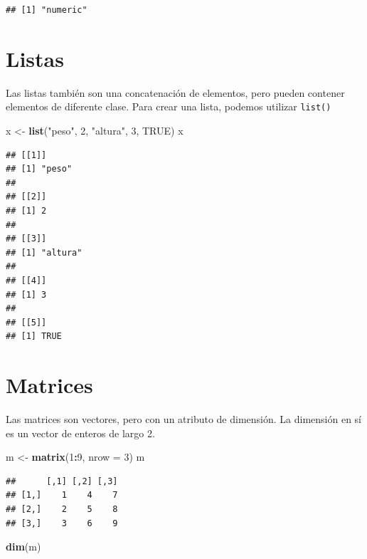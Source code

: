 \documentclass[spanish,]{book}
\newenvironment{Shaded}{\begin{snugshade}}{\end{snugshade}}
\newcommand{\KeywordTok}[1]{\textcolor[rgb]{0.13,0.29,0.53}{\textbf{#1}}}
\newcommand{\DataTypeTok}[1]{\textcolor[rgb]{0.13,0.29,0.53}{#1}}
\newcommand{\DecValTok}[1]{\textcolor[rgb]{0.00,0.00,0.81}{#1}}
\newcommand{\StringTok}[1]{\textcolor[rgb]{0.31,0.60,0.02}{#1}}
\newcommand{\OtherTok}[1]{\textcolor[rgb]{0.56,0.35,0.01}{#1}}
\newcommand{\OperatorTok}[1]{\textcolor[rgb]{0.81,0.36,0.00}{\textbf{#1}}}
\newcommand{\NormalTok}[1]{#1}
\begin{document}
\begin{verbatim}
## [1] "numeric"
\end{verbatim}

\section{Listas}\label{listas}

Las listas también son una concatenación de elementos, pero pueden
contener elementos de diferente clase. Para crear una lista, podemos
utilizar \texttt{list()}

\begin{Shaded}
\begin{Highlighting}[]
\NormalTok{x <-}\StringTok{ }\KeywordTok{list}\NormalTok{(}\StringTok{"peso"}\NormalTok{, }\DecValTok{2}\NormalTok{, }\StringTok{"altura"}\NormalTok{, }\DecValTok{3}\NormalTok{, }\OtherTok{TRUE}\NormalTok{)}
\NormalTok{x}
\end{Highlighting}
\end{Shaded}

\begin{verbatim}
## [[1]]
## [1] "peso"
## 
## [[2]]
## [1] 2
## 
## [[3]]
## [1] "altura"
## 
## [[4]]
## [1] 3
## 
## [[5]]
## [1] TRUE
\end{verbatim}

\section{Matrices}\label{matrices}

Las matrices son vectores, pero con un atributo de dimensión. La
dimensión en sí es un vector de enteros de largo 2.

\begin{Shaded}
\begin{Highlighting}[]
\NormalTok{m <-}\StringTok{ }\KeywordTok{matrix}\NormalTok{(}\DecValTok{1}\OperatorTok{:}\DecValTok{9}\NormalTok{, }\DataTypeTok{nrow =} \DecValTok{3}\NormalTok{)}
\NormalTok{m}
\end{Highlighting}
\end{Shaded}

\begin{verbatim}
##      [,1] [,2] [,3]
## [1,]    1    4    7
## [2,]    2    5    8
## [3,]    3    6    9
\end{verbatim}

\begin{Shaded}
\begin{Highlighting}[]
\KeywordTok{dim}\NormalTok{(m)}
\end{Highlighting}
\end{Shaded}
\end{document}
